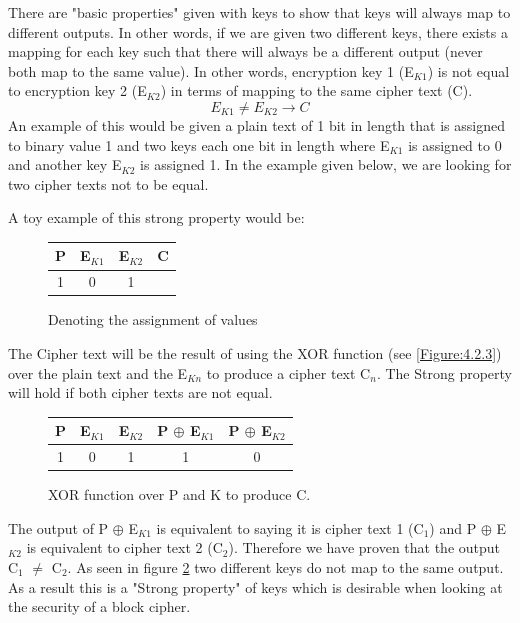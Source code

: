 \documentclass[11pt,a4paper]{report}
\begin{document}
There are "basic properties" given with keys to show that keys will always map to different outputs. In other words, if we are given two different keys, there exists a mapping for each key such that there will always be a different output (never both map to the same value). In other words, encryption key 1 (E$_{K1}$) is not equal to encryption key 2 (E$_{K2}$) in terms of mapping to the same cipher text (C).
\begin{displaymath}
E_{K1} \neq E_{K2} \rightarrow C
\end{displaymath}
An example of this would be given a plain text of 1 bit in length that is assigned to binary value 1 and two keys each one bit in length where E$_{K1}$ is assigned to 0 and another key E$_{K2}$ is assigned 1. In the example given below, we are looking for two cipher texts not to be equal.

A toy example of this strong property would be:

\begin{figure}[H]
\centering
\label{tab:assignment of values}
\begin{tabular}{|c|c|c|c|} 
\hline
P & E$_{K1}$ & E$_{K2}$ & C \\ \hline
1 & 0 & 1 & {}\\ 
\hline
\end{tabular}
\caption{Denoting the assignment of values}
\end{figure}
The Cipher text will be the result of using the XOR function (see \ref{Figure:4.2.3}) over the plain text and the E$_{Kn}$ to produce a cipher text C$_n$. The Strong property will hold if both cipher texts are not equal. 

\begin{figure}[H]
\centering
\label{tab:XOR function}
\begin{tabular}{|c|c|c|c|c|}
\hline
P & E$_{K1}$ & E$_{K2}$ & P $\oplus$ E$_{K1}$ & P $\oplus$ E$_{K2}$\\ \hline
1 & 0 & 1 & 1 & 0 \\
\hline
\end{tabular} 
\caption{XOR function over P and K to produce C.} 
\end{figure}

The output of P $\oplus$ E$_{K1}$ is equivalent to saying it is cipher text 1 (C$_1$) and P $\oplus$ E$_{K2}$ is equivalent to cipher text 2 (C$_2$). Therefore we have proven that the output C$_1$ $\neq$ C$_2$.  
 As seen in figure \ref{tab:XOR function} two different keys do not map to the same output. As a result this is a "Strong property" of keys which is desirable when looking at the security of a block cipher. 
 
\end{document}
